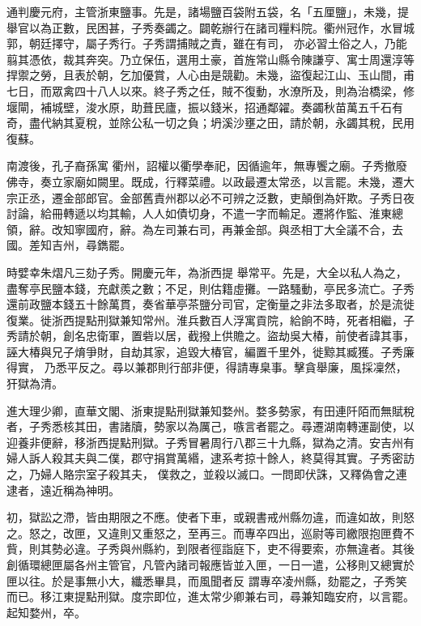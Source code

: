 \begin{pinyinscope}
 通判慶元府，主管浙東鹽事。先是，諸場鹽百袋附五袋，名「五厘鹽」，未幾，提舉官以為正數，民困甚，子秀奏蠲之。闢乾辦行在諸司糧料院。衢州冠作，水冒城郭，朝廷擇守，屬子秀行。子秀謂捕賊之責，雖在有司，
 亦必習土俗之人，乃能翦其憑依，裁其奔突。乃立保伍，選用土豪，首旌常山縣令陳謙亨、寓士周還淳等捍禦之勞，且表於朝，乞加優賞，人心由是競勸。未幾，盜復起江山、玉山間，甫七日，而眾禽四十八人以來。終子秀之任，賊不復動，水潦所及，則為治橋梁，修堰閘，補城壁，浚水原，助葺民廬，振以錢米，招通鄰糴。奏蠲秋苗萬五千石有奇，盡代納其夏稅，並除公私一切之負；坍溪沙壅之田，請於朝，永蠲其稅，民用復蘇。



 南渡後，孔子裔孫寓
 衢州，詔權以衢學奉祀，因循逾年，無專饗之廟。子秀撤廢佛寺，奏立家廟如闕里。既成，行釋菜禮。以政最遷太常丞，以言罷。未幾，遷大宗正丞，遷金部郎官。金部舊責州郡以必不可辨之泛數，吏顛倒為奸欺。子秀日夜討論，給冊轉遞以均其輸，人人如債切身，不遣一字而輸足。遷將作監、淮東總領，辭。改知寧國府，辭。為左司兼右司，再兼金部。與丞相丁大全議不合，去國。差知吉州，尋鐫罷。



 時嬖幸朱熠凡三劾子秀。開慶元年，為浙西提
 舉常平。先是，大全以私人為之，盡奪亭民鹽本錢，充獻羨之數；不足，則估籍虛攤。一路騷動，亭民多流亡。子秀還前政鹽本錢五十餘萬貫，奏省華亭茶鹽分司官，定衡量之非法多取者，於是流徙復業。徙浙西提點刑獄兼知常州。淮兵數百人浮寓貢院，給餉不時，死者相繼，子秀請於朝，創名忠衛軍，置砦以居，截撥上供贍之。盜劫吳大椿，前使者諱其事，誣大椿與兄子焴爭財，自劫其家，追毀大椿官，編置千里外，徙黥其臧獲。子秀廉得實，
 乃悉平反之。尋以兼郡則行部非便，得請專臬事。擊貪舉廉，風採凜然，犴獄為清。



 進大理少卿，直華文閣、浙東提點刑獄兼知婺州。婺多勢家，有田連阡陌而無賦稅者，子秀悉核其田，書諸牘，勢家以為厲己，嗾言者罷之。尋遷湖南轉運副使，以迎養非便辭，移浙西提點刑獄。子秀冒暑周行八郡三十九縣，獄為之清。安吉州有婦人訴人殺其夫與二僕，郡守捐賞萬緡，逮系考掠十餘人，終莫得其實。子秀密訪之，乃婦人賂宗室子殺其夫，
 僕救之，並殺以滅口。一問即伏誅，又釋偽會之連逮者，遠近稱為神明。



 初，獄訟之滯，皆由期限之不應。使者下車，或親書戒州縣勿違，而違如故，則怒之。怒之，改匣，又違則又重怒之，至再三。而專卒四出，巡尉等司繳限抱匣費不貲，則其勢必違。子秀與州縣約，到限者徑詣庭下，吏不得要索，亦無違者。其後創循環總匣屬各州主管官，凡管內諸司報應皆並入匣，一日一遣，公移則又總實於匣以往。於是事無小大，纖悉畢具，而風聞者反
 謂專卒凌州縣，劾罷之，子秀笑而已。移江東提點刑獄。度宗即位，進太常少卿兼右司，尋兼知臨安府，以言罷。起知婺州，卒。




\end{pinyinscope}
